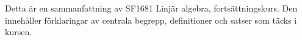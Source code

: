 Detta är en sammanfattning av SF1681 Linjär algebra, fortsättningskurs. Den innehåller förklaringar av centrala begrepp, definitioner och satser som täcks i kursen.